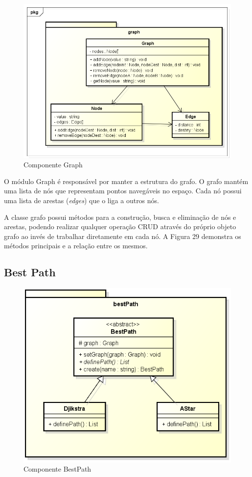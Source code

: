 \begin{figure}[h]
	\centering
	\label{fig29}
		\includegraphics[keepaspectratio=true,scale=0.5]{figuras/pkggraph.png}
	\caption{Componente Graph}
\end{figure}

O módulo Graph é responsável por manter a estrutura do grafo. O grafo mantém uma lista de nós que representam pontos navegáveis no espaço. Cada nó possui uma lista de arestas (\textit{edges}) que o liga a outros nós.

A classe grafo possui métodos para a construção, busca e eliminação de nós e arestas, podendo realizar qualquer operação CRUD através do próprio objeto grafo ao invés de trabalhar diretamente em cada nó. A Figura 29 demonstra os métodos principais e a relação entre os mesmos.

\subsection{Best Path}

\begin{figure}[h]
	\centering
	\label{fig30}
		\includegraphics[keepaspectratio=true,scale=0.5]{figuras/pkgbestPath.png}
	\caption{Componente BestPath}
\end{figure}

